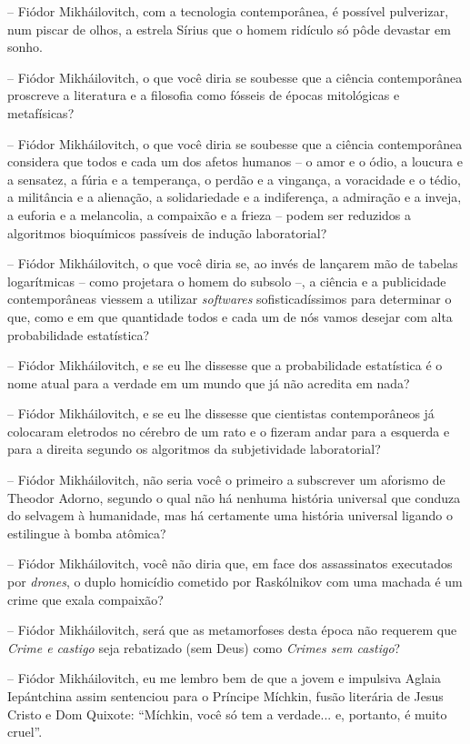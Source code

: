 -- Fiódor Mikháilovitch, com a tecnologia contemporânea, é possível
pulverizar, num piscar de olhos, a estrela Sírius que o homem ridículo
só pôde devastar em sonho.

-- Fiódor Mikháilovitch, o que você diria se soubesse que a ciência
contemporânea proscreve a literatura e a filosofia como fósseis de
épocas mitológicas e metafísicas?

-- Fiódor Mikháilovitch, o que você diria se soubesse que a ciência
contemporânea considera que todos e cada um dos afetos humanos -- o amor
e o ódio, a loucura e a sensatez, a fúria e a temperança, o perdão e a
vingança, a voracidade e o tédio, a militância e a alienação, a
solidariedade e a indiferença, a admiração e a inveja, a euforia e a
melancolia, a compaixão e a frieza -- podem ser reduzidos a algoritmos
bioquímicos passíveis de indução laboratorial?

-- Fiódor Mikháilovitch, o que você diria se, ao invés de lançarem mão
de tabelas logarítmicas -- como projetara o homem do subsolo --, a
ciência e a publicidade contemporâneas viessem a utilizar
\emph{softwares} sofisticadíssimos para determinar o que, como e em que
quantidade todos e cada um de nós vamos desejar com alta probabilidade
estatística?

-- Fiódor Mikháilovitch, e se eu lhe dissesse que a probabilidade
estatística é o nome atual para a verdade em um mundo que já não
acredita em nada?

-- Fiódor Mikháilovitch, e se eu lhe dissesse que cientistas
contemporâneos já colocaram eletrodos no cérebro de um rato e o fizeram
andar para a esquerda e para a direita segundo os algoritmos da
subjetividade laboratorial?

-- Fiódor Mikháilovitch, não seria você o primeiro a subscrever um
aforismo de Theodor Adorno, segundo o qual não há nenhuma história
universal que conduza do selvagem à humanidade, mas há certamente uma
história universal ligando o estilingue à bomba atômica?

-- Fiódor Mikháilovitch, você não diria que, em face dos assassinatos
executados por \emph{drones}, o duplo homicídio cometido por Raskólnikov
com uma machada é um crime que exala compaixão?

-- Fiódor Mikháilovitch, será que as metamorfoses desta época não
requerem que \emph{Crime e castigo} seja rebatizado (sem Deus) como
\emph{Crimes sem castigo}?

-- Fiódor Mikháilovitch, eu me lembro bem de que a jovem e impulsiva
Aglaia Iepántchina assim sentenciou para o Príncipe Míchkin, fusão
literária de Jesus Cristo e Dom Quixote: ``Míchkin, você só tem a
verdade... e, portanto, é muito cruel''.

